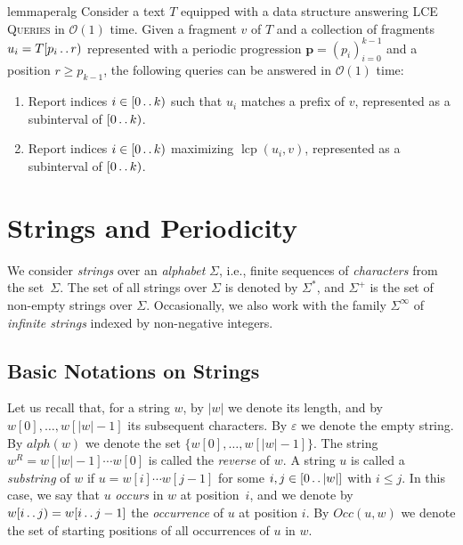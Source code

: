 \documentclass[a4paper]{article}
\theoremstyle{definition}
\theoremstyle{remark}
\newcommand{\LCEQ}{\textsc{LCE Queries}\xspace}
\newcommand{\lcp}{\operatorname{lcp}}
\newcommand{\dd}{\mathinner{\ldotp\ldotp}}
\newcommand{\aalph}{\mathit{alph}}
\newcommand{\Occ}{\mathit{Occ}}
\newcommand{\Oh}{\mathcal{O}}
\begin{document}
\begin{restatable}{lemma}{peralg}\label{lem:peralg}
  Consider a text $T$ equipped with a data structure answering \LCEQ in $\Oh(1)$ time.
  Given a fragment $v$ of $T$ and a collection of fragments $u_i=T[p_i\dd r)$ represented with a periodic progression $\mathbf{p}=(p_i)_{i=0}^{k-1}$ and a position $r \ge p_{k-1}$,
  the following queries can be answered in $\Oh(1)$ time:
  \begin{enumerate}[label=(\alph*)]
    \item\label{it:perpref} Report indices $i\in [0\dd k)$ such that $u_i$ matches a prefix of $v$, represented as a subinterval of $[0\dd k)$.
     \item\label{it:permax} Report indices $i\in [0\dd k)$ maximizing $\lcp(u_i,v)$, represented as a subinterval of $[0\dd k)$.
  \end{enumerate}
\end{restatable}



\section{Strings and Periodicity}\label{chp:prelim}

We consider \emph{strings} over an \emph{alphabet} $\Sigma$, i.e., finite sequences of \emph{characters} from the set~$\Sigma$.
The set of all strings over $\Sigma$ is denoted by $\Sigma^*$, and $\Sigma^+$ is the set of non-empty strings over $\Sigma$.
Occasionally, we also work with the family $\Sigma^\infty$ of \emph{infinite strings} indexed by non-negative integers.


\subsection{Basic Notations on Strings}\label{sec:comb}
Let us recall that, for a string $w$, by $|w|$ we denote its length, and by $w[0],\ldots,w[|w|-1]$ its subsequent characters.
By $\varepsilon$ we denote the empty string.
By $\aalph(w)$ we denote the set $\{w[0],\ldots,w[|w|-1]\}$.
The string $w^R = w[|w|-1]\cdots w[0]$ is called the \emph{reverse} of $w$.
A string $u$ is called a \emph{substring} of $w$ if $u=w[i] \cdots w[j-1]$
for some $i,j\in [0\dd |w|]$ with $i\le j$.
In this case, we say that $u$ \emph{occurs} in $w$ at position~$i$, and we denote by $w[i\dd j)=w[i\dd j-1]$
the \emph{occurrence} of $u$ at position $i$.
By $\Occ(u,w)$ we denote the set of starting positions of all occurrences of $u$ in $w$.
\end{document}
